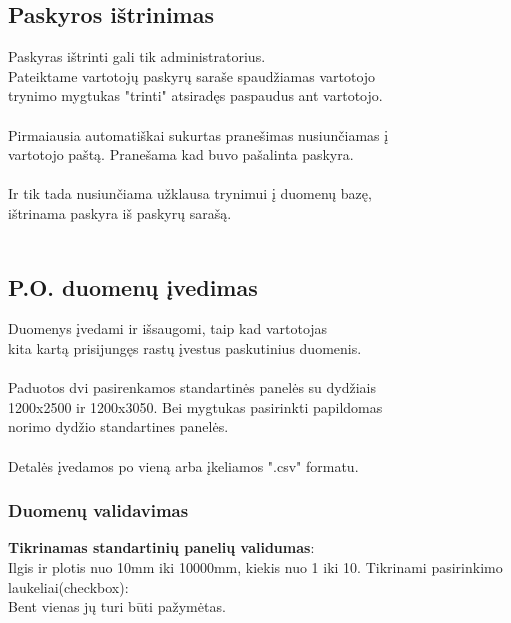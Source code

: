 \documentclass[a4paper,12pt]{article}
\begin{document}
\subsection{ Paskyros ištrinimas }

Paskyras ištrinti gali tik administratorius.\\

Pateiktame vartotojų paskyrų saraše spaudžiamas vartotojo \\
trynimo mygtukas "trinti" atsiradęs paspaudus ant vartotojo.\\\\

Pirmaiausia automatiškai sukurtas pranešimas nusiunčiamas į \\
vartotojo paštą. Pranešama kad buvo pašalinta paskyra. \\\\

Ir tik tada nusiunčiama užklausa trynimui į duomenų bazę, \\
ištrinama paskyra iš paskyrų sarašą. \\\\
	
	
\subsection{ P.O. duomenų įvedimas }

Duomenys įvedami ir išsaugomi, taip kad vartotojas \\
kita kartą prisijungęs rastų įvestus paskutinius duomenis.\\\\
Paduotos dvi pasirenkamos standartinės panelės su dydžiais \\
1200x2500 ir 1200x3050. Bei mygtukas pasirinkti papildomas\\
norimo dydžio standartines panelės. \\\\
Detalės įvedamos po vieną arba įkeliamos ".csv" formatu. 

\subsubsection{Duomenų validavimas}
\textbf{Tikrinamas standartinių panelių validumas}:\\
	Ilgis ir plotis nuo 10mm iki 10000mm, kiekis nuo 1 iki 10.
Tikrinami pasirinkimo laukeliai(checkbox): \\
Bent vienas jų turi būti pažymėtas.
\end{document}

